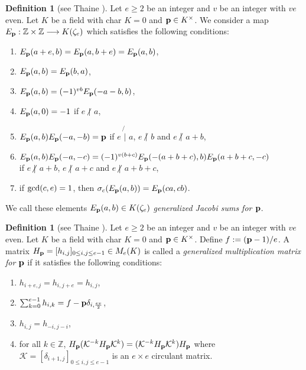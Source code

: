\documentclass[a4paper, 11pt]{amsart}
\newcommand{\notmid}{\mathrel{\ooalign{$\mkern-5mu\not$\crcr$|$}}}
\newcommand{\Z}{\mathbb Z}
\theoremstyle{plain}
\theoremstyle{definition}
\newtheorem{defn}[thm]{Definition}
\numberwithin{equation}{section}
\begin{document}
\begin{defn}[{see Thaine \cite[Proposition~9 and Proposition~10]{Tha04}}]\label{def:T9and10}
Let $e \geq 2$ be an integer
and $v$ be an integer with $ve$ even.
Let $K$ be a field with char $K=0$ and ${\bf p}\in K^{\times}$. 
We consider a map $E_{\bf p}: \Z \times \Z \longrightarrow K(\zeta_e)$ which satisfies the following conditions:
\begin{enumerate}
  \setlength{\parskip}{0cm}
  \setlength{\itemsep}{0cm}
\item $E_{\bf p}(a+e,b)=E_{\bf p}(a,b+e)=E_{\bf p}(a,b)$,
\item $E_{\bf p}(a,b)=E_{\bf p}(b,a)$,
\item $E_{\bf p}(a,b)=(-1)^{vb}E_{\bf p}(-a-b,b)$,
\item $E_{\bf p}(a,0)=-1$ if $e$ $\notmid$ $a$,
\item $E_{\bf p}(a,b)E_{\bf p}(-a,-b) = {\bf p}$ 
if $e$ $\not{|}$ $a$, $e$ $\notmid$ $b$ and $e$ $\notmid$ $a+b$,
\item $E_{\bf p}(a,b)E_{\bf p}(-a,-c) 
= (-1)^{v(b+c)}E_{\bf p}(-(a+b+c),b)E_{\bf p}(a+b+c,-c)$ \\
if $e$ $\notmid$ $a+b$, $e$ $\notmid$
$a+c$ 
and $e$ $\notmid$ $a+b+c$,
\item if ${\rm gcd}(c,e)=1$, then $\sigma_c (E_{\bf p}(a,b))=E_{\bf p}(ca,cb)$.
\end{enumerate}
We call these elements $E_{\bf p}(a,b) \in K(\zeta_e)$ {\it generalized Jacobi sums  for ${\bf p}$}. 
\end{defn}

\begin{defn}[{see Thaine \cite[Proposition~9 and Proposition~10]{Tha04}}]\label{def:T9and10_2}
Let $e \geq 2$ be an integer
and $v$ be an integer with $ve$ even.
Let $K$ be a field with char $K=0$ and 
${\bf p}\in K^{\times}$. 
Define $f:=({\bf p}-1)/e$. 
A matrix $H_{\bf p}=[h_{i,j}]_{0\leq i,j\leq e-1} \in M_e(K)$
is called a {\it generalized multiplication matrix for ${\bf p}$} 
if it satisfies the following conditions:
\begin{enumerate}
\item[(i)] $h_{i+e,j}=h_{i,j+e}=h_{i,j}$,
\item[(iii)] $\sum^{e-1}_{k=0}h_{i,k}=f-{\bf p}\delta_{i,\frac{ev}{2}}$,
\item[(v)] $h_{i,j}=h_{-i,j-i}$,
\item[(vii)]  for all $k \in \Z$, $H_{\bf p}(\mathcal{K}^{-k}H_{\bf p}\mathcal{K}^{k})
=(\mathcal{K}^{-k}H_{\bf p}\mathcal{K}^{k})H_{\bf p}$ where 
$\mathcal{K}=[\delta_{i+1,j}]_{0\leq i,j\leq e-1}$ 
is an $e \times e$ circulant matrix.
\end{enumerate}
\end{defn}
\end{document}
